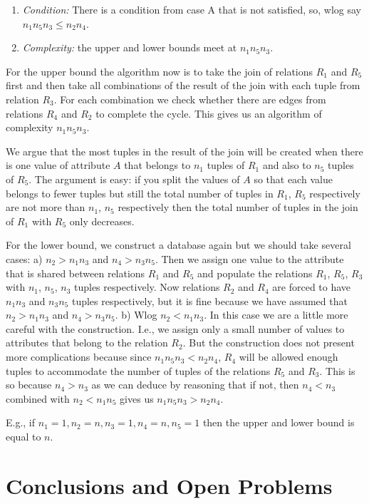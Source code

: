 \begin{enumerate}
 \item {\sl Condition:} There is a condition from case A that is not satisfied, so, wlog say $n_1 n_5 n_3 \leq n_2 n_4$.

\item {\sl Complexity:}  the upper and lower bounds meet at  $n_1n_5n_3$.
\end{enumerate}

For the upper bound the algorithm now is to take the join of relations
$R_1$ and $R_5$ first and then take all combinations of the result
of the join with each tuple from relation $R_3$. For each combination we check
whether there are edges from relations $R_4$ and $R_2$ to complete the cycle.
This gives us an algorithm of complexity $n_1n_5n_3$.

We argue that
the most tuples in the result of the join will be created when
there is one value of attribute $A$ that belongs to $n_1$ tuples
of $R_1$ and also to $n_5$ tuples of $R_5$.
The argument is easy: if you split the values of
$A$ so that each value belongs to fewer tuples but still the total number of tuples in
$R_1$, $R_5$ respectively are not more than $n_1 $, $n_5 $ respectively then the total number
of tuples in the join of $R_1$ with $R_5$ only decreases.


For the lower bound, we construct a database
again but we should take several cases:
a) $ n_2> n_1 n_3$ and $ n_4> n_3n_5$. Then we assign one value to the
attribute that is shared between relations $R_1$ and $ R_5$ and
populate the relations $ R_1$, $R_5$, $R_3$ with $n_1$, $n_5$, $n_3$ tuples respectively.
Now relations $R_2$ and $R_4$ are forced to have $ n_1 n_3$  and $n_3n_5$ tuples
respectively, but it is fine because we have assumed that  $n_2 > n_1 n_3$ and $n_4 > n_3n_5$.
b) Wlog  $n_2 < n_1 n_3$. In this case we are a little more careful with the
construction. I.e., we assign only a small number of values to
attributes that belong to the relation $R_2$.  But the construction
does not present more complications because since $n_1 n_5 n_3 < n_2 n_4$,
$R_4$ will be allowed enough tuples to accommodate the number of tuples
of the relations $R_5$ and $R_3$. This is so because $n_4>n_3$ as we can deduce by
reasoning that if not, then $n_4<n_3$ combined with $n_2<n_1n_5$ gives us $n_1 n_5 n_3 > n_2 n_4$.

E.g., if $n_1=1, n_2=n, n_3=1, n_4=n,n_5=1$ then the upper and lower bound is equal to $n$.

\section{Conclusions and Open Problems}
\label{conclusions-sect}

